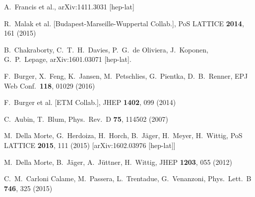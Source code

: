 \documentclass[epj,onecolumn]{webofc}
\begin{document}
\begin{thebibliography}{}
  A.~Francis et al.,
  arXiv:1411.3031 [hep-lat]

  R.~Malak et al. [Budapest-Marseille-Wuppertal Collab.],
  PoS LATTICE {\bf 2014}, 161 (2015)

  B.~Chakraborty, C.~T.~H.~Davies, P.~G.~de Oliviera, J.~Koponen, G.~P.~Lepage,
  arXiv:1601.03071 [hep-lat].

  F.~Burger, X.~Feng, K.~Jansen, M.~Petschlies, G.~Pientka, D.~B.~Renner,
  EPJ Web Conf.\  {\bf 118}, 01029 (2016)

  F.~Burger et al. [ETM Collab.],
  JHEP {\bf 1402}, 099 (2014)

  C.~Aubin, T.~Blum,
  Phys.\ Rev.\ D {\bf 75}, 114502 (2007)

  M.~Della Morte, G.~Herdoiza, H.~Horch, B.~J\"ager, H.~Meyer, H.~Wittig,
  PoS LATTICE {\bf 2015}, 111 (2015)
  [arXiv:1602.03976 [hep-lat]]

  M.~Della Morte, B.~J\"ager, A.~J\"uttner, H.~Wittig,
  JHEP {\bf 1203}, 055 (2012)

  C.~M.~Carloni Calame, M.~Passera, L.~Trentadue, G.~Venanzoni,
  Phys.\ Lett.\ B {\bf 746}, 325 (2015)


\end{thebibliography}
\end{document}
